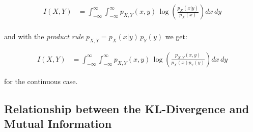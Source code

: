 \begin{frame}{\subsubsecname}



\begin{align}
\label{eq:mutualcont1}
I(X,Y) 
&= \int_{-\infty}^{\infty} \int_{-\infty}^{\infty} p_{X,Y}(x,y) \, \log \left(\frac{p_X(x|y)}{p_X(x)}\right) dx \, dy \\
\end{align}

\pause

and with the \emph{product rule} $p_{X,Y} = p_X(x|y)\,p_Y(y)$ we get:

\begin{align}
\label{eq:mutualcont2}
I(X,Y)
&= \int_{-\infty}^{\infty} \int_{-\infty}^{\infty} p_{X,Y}(x,y) \, \log \left(\frac{p_{X,Y}(x,y)}{p_X(x) p_Y(y)}\right) dx \, dy
\end{align}

for the continuous case.

\end{frame}




\newpage

\subsection{Relationship between the KL-Divergence and Mutual Information}

